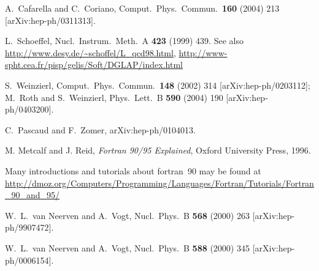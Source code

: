 \documentclass[12pt]{article}
\begin{document}
\begin{thebibliography}{99}

 A.~Cafarella and C.~Coriano,
Comput.\ Phys.\ Commun.\  {\bf 160} (2004) 213
[arXiv:hep-ph/0311313].

L.~Schoeffel,
Nucl.\ Instrum.\ Meth.\ A {\bf 423} (1999) 439.
See also \url{http://www.desy.de/~schoffel/L_qcd98.html},
\url{http://www-spht.cea.fr/pisp/gelis/Soft/DGLAP/index.html}


S.~Weinzierl,
Comput.\ Phys.\ Commun.\  {\bf 148} (2002) 314
[arXiv:hep-ph/0203112];
M.~Roth and S.~Weinzierl,
Phys.\ Lett.\ B {\bf 590} (2004) 190
[arXiv:hep-ph/0403200].



C.~Pascaud and F.~Zomer,
arXiv:hep-ph/0104013.

  M. Metcalf and J. Reid, \emph{Fortran 90/95 Explained}, Oxford
  University Press, 1996.

 Many introductions and tutorials about
  fortran~90 may be found at
  \url{http://dmoz.org/Computers/Programming/Languages/Fortran/Tutorials/Fortran_90_and_95/}

  W.~L.~van Neerven and A.~Vogt,
  Nucl.\ Phys.\ B {\bf 568} (2000) 263
  [arXiv:hep-ph/9907472].

  W.~L.~van Neerven and A.~Vogt,
  Nucl.\ Phys.\ B {\bf 588} (2000) 345
  [arXiv:hep-ph/0006154].


\end{thebibliography}
\end{document}
